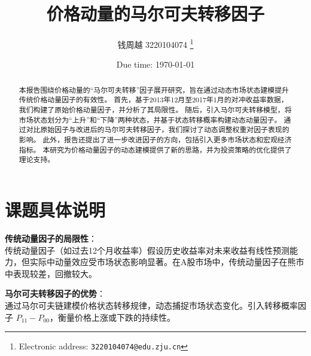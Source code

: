 \documentclass[a4paper]{article}
\begin{document}
\title{价格动量的马尔可夫转移因子}

\author{钱周越 3220104074
  \thanks{Electronic address: \texttt{3220104074@edu.zju.cn}}}
  


\date{Due time: \today}

\maketitle

\begin{abstract}
  本报告围绕价格动量的“马尔可夫转移”因子展开研究，旨在通过动态市场状态建模提升传统价格动量因子的有效性。
  首先，基于2013年12月至2017年1月的对冲收益率数据，我们构建了原始价格动量因子，并分析了其局限性。
  随后，引入马尔可夫转移模型，将市场状态划分为“上升”和“下降”两种状态，并基于状态转移概率构建动态动量因子。
  通过对比原始因子与改进后的马尔可夫转移因子，我们探讨了动态调整权重对因子表现的影响。
  此外，报告还提出了进一步改进因子的方向，包括引入更多市场状态和宏观经济指标。
  本研究为价格动量因子的动态建模提供了新的思路，并为投资策略的优化提供了理论支持。
\end{abstract}

\section{\textbf{课题具体说明}}
\noindent \textbf{传统动量因子的局限性}： \\
传统动量因子（如过去12个月收益率）假设历史收益率对未来收益有线性预测能力，但实际中动量效应受市场状态影响显著。在A股市场中，传统动量因子在熊市中表现较差，回撤较大。

\noindent \textbf{马尔可夫转移因子的优势}： \\
通过马尔可夫链建模价格状态转移规律，动态捕捉市场状态变化。引入转移概率因子 \( P_{11} - P_{00} \)，衡量价格上涨或下跌的持续性。
\end{document}
